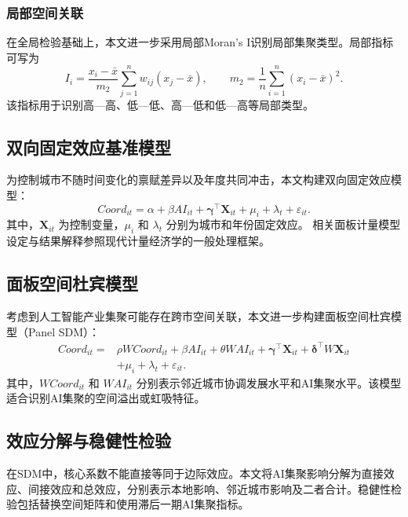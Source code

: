 \documentclass[12pt, a4paper]{ctexart}
\begin{document}
\subsubsection{局部空间关联}
在全局检验基础上，本文进一步采用局部Moran's I识别局部集聚类型。局部指标可写为
\begin{equation}
    I_i=\frac{x_i-\bar{x}}{m_2}\sum_{j=1}^{n}w_{ij}(x_j-\bar{x}),
    \qquad
    m_2=\frac{1}{n}\sum_{i=1}^{n}(x_i-\bar{x})^2.
\end{equation}
该指标用于识别高—高、低—低、高—低和低—高等局部类型\cite{anselin1995lisa}。

\subsection{双向固定效应基准模型}
为控制城市不随时间变化的禀赋差异以及年度共同冲击，本文构建双向固定效应模型：
\begin{equation}
    Coord_{it}=\alpha+\beta AI_{it}
    +\boldsymbol{\gamma}^{\top}\mathbf{X}_{it}
    +\mu_i+\lambda_t+\varepsilon_{it}.
\end{equation}
其中，$\mathbf{X}_{it}$ 为控制变量，$\mu_i$ 和 $\lambda_t$ 分别为城市和年份固定效应。
相关面板计量模型设定与结果解释参照现代计量经济学的一般处理框架\cite{ref7}。

\subsection{面板空间杜宾模型}
考虑到人工智能产业集聚可能存在跨市空间关联，本文进一步构建面板空间杜宾模型（Panel SDM）：
\begin{equation}
    \begin{aligned}
    Coord_{it}={}&\rho WCoord_{it}
    +\beta AI_{it}+\theta WAI_{it}
    +\boldsymbol{\gamma}^{\top}\mathbf{X}_{it}
    +\boldsymbol{\delta}^{\top}W\mathbf{X}_{it}\\
    &+\mu_i+\lambda_t+\varepsilon_{it}.
    \end{aligned}
\end{equation}
其中，$WCoord_{it}$ 和 $WAI_{it}$ 分别表示邻近城市协调发展水平和AI集聚水平。该模型适合识别AI集聚的空间溢出或虹吸特征\cite{lesage2009spatial,elhorst2014spatial}。

\subsection{效应分解与稳健性检验}
在SDM中，核心系数不能直接等同于边际效应。本文将AI集聚影响分解为直接效应、间接效应和总效应，分别表示本地影响、邻近城市影响及二者合计。稳健性检验包括替换空间矩阵和使用滞后一期AI集聚指标。
\end{document}
